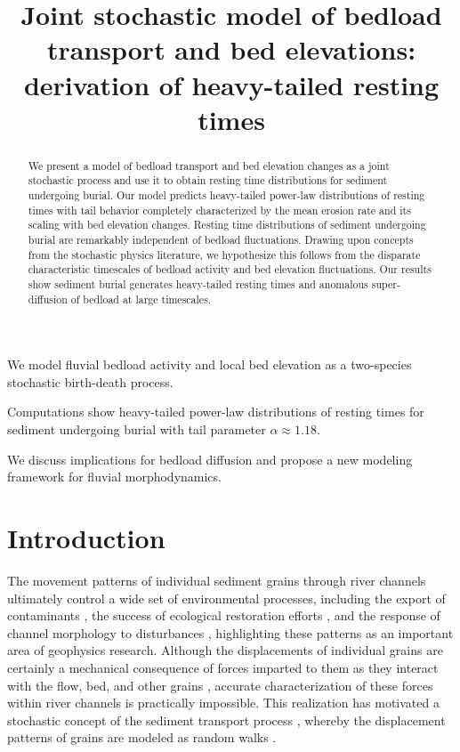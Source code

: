 \documentclass[draft]{agujournal2018}
\begin{document}
\title{Joint stochastic model of bedload transport and bed elevations: derivation of heavy-tailed resting times}

\begin{keypoints}
\item We model fluvial bedload activity and local bed elevation as a two-species stochastic birth-death process.
\item Computations show heavy-tailed power-law distributions of resting times for sediment undergoing burial with tail parameter $\alpha\approx 1.18$.
\item We discuss implications for bedload diffusion and propose a new modeling framework for fluvial morphodynamics.

\end{keypoints}

\begin{abstract}
We present a model of bedload transport and bed elevation changes as a joint stochastic process and use it to obtain resting time distributions for sediment undergoing burial.
Our model predicts heavy-tailed power-law distributions of resting times with tail behavior completely characterized by the mean erosion rate and its scaling with bed elevation changes.
Resting time distributions of sediment undergoing burial are remarkably independent of bedload fluctuations.
Drawing upon concepts from the stochastic physics literature, we hypothesize this follows from the disparate characteristic timescales of bedload activity and bed elevation fluctuations.
Our results show sediment burial generates heavy-tailed resting times and anomalous super-diffusion of bedload at large timescales.
\end{abstract} 

\section{Introduction}

The movement patterns of individual sediment grains through river channels ultimately control a wide set of environmental processes, including the export of contaminants \citep[e.g.,][]{Malmon2005,Macklin2006}, the success of ecological restoration efforts \citep[e.g.,][]{Gaeuman2017}, and the response of channel morphology to disturbances \citep[e.g.,][]{Hassan2017}, highlighting these patterns as an important area of geophysics research.
Although the displacements of individual grains are certainly a mechanical consequence of forces imparted to them as they interact with the flow, bed, and other grains \citep[e.g.,][]{Wiberg1985, Vowinckel2014}, accurate characterization of these forces within river channels is practically impossible.
This realization has motivated a stochastic concept of the sediment transport process \citep[e.g.,][]{Einstein1937}, whereby the displacement patterns of grains are modeled as random walks \citep[e.g.,][]{Weiss1994}.
\end{document}
